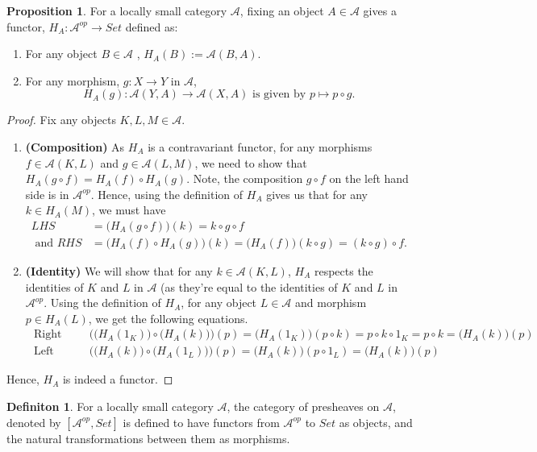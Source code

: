 \documentclass[18pt,a4paper]{article}
\theoremstyle{definition}
\newtheorem{definition}[theorem]{Definiton}
\newtheorem{proop}[theorem]{Proposition}
\begin{document}
\begin{proop} %
	For a locally small category $\mathcal{A}$, fixing an object $A \in \mathcal{A} $ gives
	a functor, $H_A: \mathcal{A} ^{op} \rightarrow Set$ defined as:
	\begin{enumerate}[label=(\roman*)]
		\item For any object $B \in \mathcal{A} $ , $H_A(B):=\mathcal{A} (B,A)$.
		\item For any morphism, $g : X \rightarrow Y $ in $\mathcal{A}$,
			\[H_A(g): \mathcal{A} (Y,A) \rightarrow \mathcal{A}(X,A)
			\text{ is given by } p \mapsto p \circ g.\]
	\end{enumerate}
\end{proop}
\begin{proof}\setcounter{equation}{0}
	Fix any objects $K,L,M \in \mathcal{A} $.
	\begin{enumerate}[label=\Roman*]
		\item \textbf{ (Composition) } As $H_A$ is a contravariant functor, for
			any morphisms $f\in \mathcal{A} (K,L)$ and $g \in
			\mathcal{A}(L,M)$, we need to show that
			$H_A(g \circ f)=H_A(f) \circ H_A(g)$. Note,
			the composition $g\circ f$ on the left hand side is in $\mathcal{A} ^{op}$.
			Hence, using the definition of $H_A$ gives us that for any $k \in H_A(M) $, we must have
			\begin{align*}
				LHS&=\Big( H_A(g \circ f) \Big) (k)=k\circ g\circ f \\
				\text{ and } RHS&=\Big( H_A(f)\circ H_A(g) \Big) (k)=\Big( H_A(f) \Big) (k \circ g)
			=(k\circ g)\circ f. \end{align*}
		\item \textbf{ (Identity) } We will show that for any $k \in \mathcal{A} (K,L)$, $H_A$ respects the identities
			of $K$ and $L$ in $\mathcal{A}$ (as they're equal to the identities of $K$ and
			$L$ in $\mathcal{A} ^{op}$. Using the definition of $H_A$,
			for any object $L\in \mathcal{A} $ and
			morphism $p \in H_A(L)$, we get the following equations.
			\begin{align*}
				\text{ Right Identity: }& \Big( \big( H_A(1_K) \big) \circ \big( H_A(k) \big) \Big)(p)
				=\big( H_A(1_K) \big) (p \circ k) = p \circ k \circ 1_K=p \circ k = \big( H_A(k) \big)(p)\\
				\text{ Left Identity: }& \Big( \big( H_A(k) \big) \circ \big( H_A(1_L) \big) \Big)(p)
				=\big( H_A(k) \big) (p \circ 1_L) = \big( H_A(k) \big) (p)
			\end{align*}

		\end{enumerate}
		Hence, $H_A$ is indeed a functor.
	\end{proof}
	\begin{definition} %
		For a locally small category $\mathcal{A} $, the category of presheaves on $\mathcal{A} $, denoted by $[\mathcal{A} ^{op},Set]$
		is defined to have functors from $\mathcal{A} ^{op}$ to $Set$ as objects,
		and the natural transformations between them as morphisms.
	\end{definition}
\end{document}

